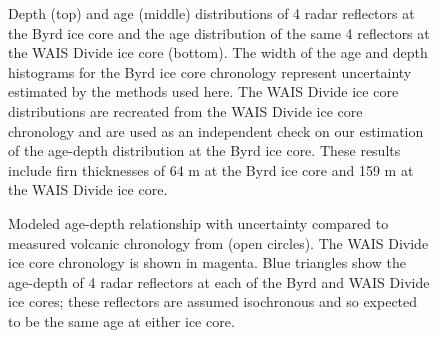 \begin{figure}[h]
\centering
{}
\caption[]{Depth (top) and age (middle) distributions of 4 radar reflectors at the Byrd ice core and the age distribution of the same 4 reflectors at the WAIS Divide ice core (bottom). The width of the age and depth histograms for the Byrd ice core chronology represent uncertainty estimated by the methods used here. The WAIS Divide ice core distributions are recreated from the WAIS Divide ice core chronology \citep{buizert2015} and are used as an independent check on our estimation of the age-depth distribution at the Byrd ice core. These results include firn thicknesses of 64 m at the Byrd ice core and 159 m at the WAIS Divide ice core.}
\label{fig:layer_histo}
\end{figure}

\begin{figure}[h]
\centering
{}
\caption[]{Modeled age-depth relationship with uncertainty compared to measured volcanic chronology from \citet[]{hammer1997} (open circles). The WAIS Divide ice core chronology \citep{buizert2015} is shown in magenta. Blue triangles show the age-depth of 4 radar reflectors at each of the Byrd and WAIS Divide ice cores; these reflectors are assumed isochronous and so expected to be the same age at either ice core.}
\label{fig:spaghetti}
\end{figure}

